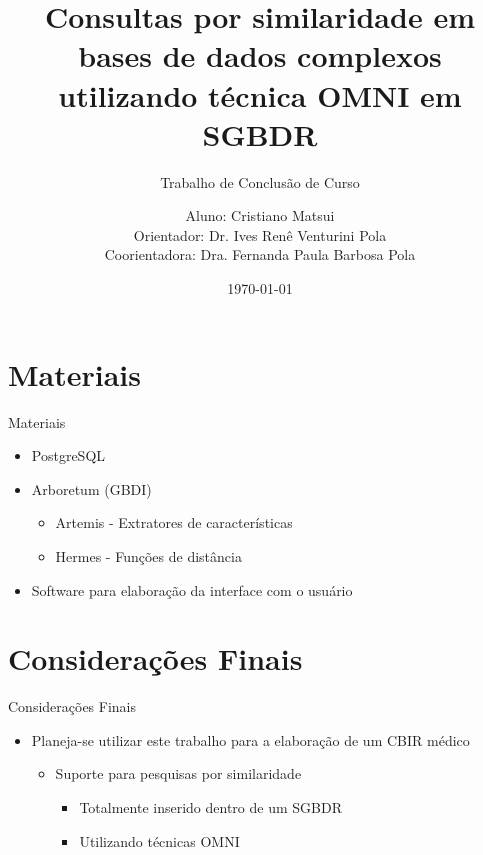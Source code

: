 \documentclass{beamer}
\begin{document}
\section{Materiais}

\begin{frame}{Materiais}
  \begin{itemize}
   \item PostgreSQL\newline
   \item Arboretum (GBDI)
   \begin{itemize}
      \item Artemis - Extratores de características
      \item Hermes - Funções de distância\newline
   \end{itemize}
   \item Software para elaboração da interface com o usuário   
  \end{itemize}

\end{frame}



\section{Considerações Finais}

\begin{frame}{Considerações Finais}
  \begin{itemize}
   \item Planeja-se utilizar este trabalho para a elaboração de um CBIR médico\newline
   \begin{itemize}
      \item Suporte para pesquisas por similaridade\newline
         \begin{itemize}
	    \item Totalmente inserido dentro de um SGBDR\newline
	    \item Utilizando técnicas OMNI
	  \end{itemize}
   \end{itemize}
  \end{itemize}
\end{frame}


\title{Consultas por similaridade em bases de dados complexos utilizando técnica OMNI em SGBDR}
\subtitle{Trabalho de Conclusão de Curso}
\author{
Aluno: Cristiano Matsui\\
Orientador: Dr. Ives Renê Venturini Pola\\
Coorientadora: Dra. Fernanda Paula Barbosa Pola
}
\date{\today}
\end{document}
